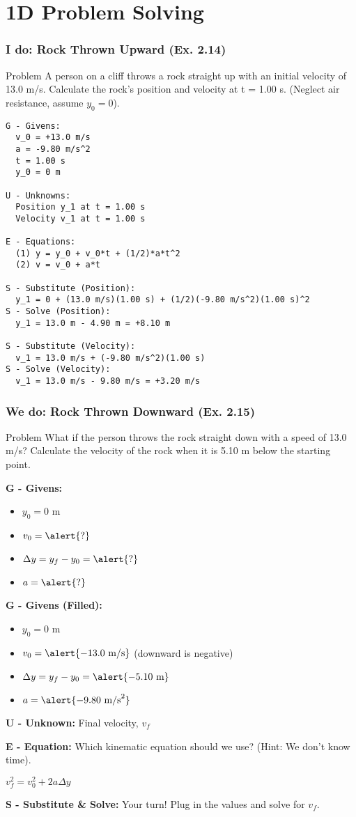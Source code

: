 \documentclass{beamer}
\begin{document}
\section{1D Problem Solving}

\begin{frame}[fragile]
\frametitle{I do: Rock Thrown Upward (Ex. 2.14)}
\begin{block}{Problem}
A person on a cliff throws a rock straight up with an initial velocity of 13.0 m/s. Calculate the rock's position and velocity at t = 1.00 s. (Neglect air resistance, assume $y_0 = 0$).
\end{block}
\pause
\begin{verbatim}
G - Givens:
  v_0 = +13.0 m/s
  a = -9.80 m/s^2
  t = 1.00 s
  y_0 = 0 m

U - Unknowns:
  Position y_1 at t = 1.00 s
  Velocity v_1 at t = 1.00 s

E - Equations:
  (1) y = y_0 + v_0*t + (1/2)*a*t^2
  (2) v = v_0 + a*t

S - Substitute (Position):
  y_1 = 0 + (13.0 m/s)(1.00 s) + (1/2)(-9.80 m/s^2)(1.00 s)^2
S - Solve (Position):
  y_1 = 13.0 m - 4.90 m = +8.10 m

S - Substitute (Velocity):
  v_1 = 13.0 m/s + (-9.80 m/s^2)(1.00 s)
S - Solve (Velocity):
  v_1 = 13.0 m/s - 9.80 m/s = +3.20 m/s
\end{verbatim}
\end{frame}

\begin{frame}
\frametitle{We do: Rock Thrown Downward (Ex. 2.15)}
\begin{block}{Problem}
What if the person throws the rock straight down with a speed of 13.0 m/s? Calculate the velocity of the rock when it is 5.10 m below the starting point.
\end{block}

\textbf{G - Givens:}
\begin{itemize}
    \item $y_0 = 0$ m
    \item $v_0 = \alert{?}$
    \item $\Delta y = y_f - y_0 = \alert{?}$
    \item $a = \alert{?}$
\end{itemize}
\pause
\textbf{G - Givens (Filled):}
\begin{itemize}
    \item $y_0 = 0$ m
    \item $v_0 = \alert{-13.0 \text{ m/s}}$ (downward is negative)
    \item $\Delta y = y_f - y_0 = \alert{-5.10 \text{ m}}$
    \item $a = \alert{-9.80 \text{ m/s}^2}$
\end{itemize}
\pause
\textbf{U - Unknown:} Final velocity, $v_f$

\textbf{E - Equation:} Which kinematic equation should we use? (Hint: We don't know time).
\begin{center} \alert{$v_f^2 = v_0^2 + 2a\Delta y$} \end{center}
\pause
\textbf{S - Substitute \& Solve:} Your turn! Plug in the values and solve for $v_f$.
\end{frame}
\end{document}
